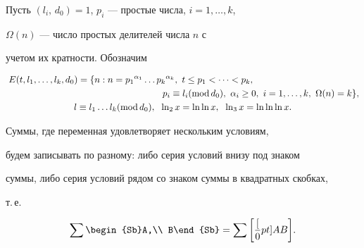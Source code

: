Пусть $(l_i, \, d_0)=1$, $p_i$ --- простые числа, $i=1,\dotsc, k$,


$\Omega(n)$ --- число простых делителей числа $n$ с


учетом их кратности. Обозначим


\begin{gather*}


E(t,l_1,\dotsc,l_k,d_0) = \{n: n =


{p_1}^{\alpha_1} \dotsc {p_k}^{\alpha_k}, \


t \le p_1 < \dotsb < p_k, \hspace{40mm} \\


%


\hspace{60mm} p_i \equiv l_i (\Mod d_0), \ \alpha_i \ge 0, \ i=1,


\dotsc, k, \ \Omega (n) = k \}, \\


%


l \equiv l_1 \dotsc l_k (\Mod d_0), \ \; \ln_2 x=\ln \ln x,


\ \; \ln_3 x= \ln \ln \ln x.


\end{gather*}





Суммы, где переменная удовлетворяет нескольким условиям,


будем записывать по разному: либо серия условий внизу под знаком


суммы, либо серия условий рядом со знаком суммы в квадратных скобках,


т.\,е.


$$


\sum\begin{Sb}A,\\ B\end{Sb} = \sum \bigg[\frac[0pt]{A}{B}\bigg].


$$





